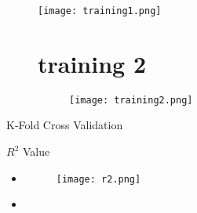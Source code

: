 \documentclass[14pt]{beamer}
\begin{document}
\begin{frame}
       \begin{figure}
            \centering
            \texttt{[image: training1.png]}            \label{fig:enter-label}
           \section{training 2}
            \begin{figure}
                \centering
                \texttt{[image: training2.png]}
                \label{fig:enter-label}
            \end{figure}
        \end{figure}
\end{frame}

\begin{frame}{K-Fold Cross Validation}
    \begin{fullpageitemize}
  \item\color{colorgreen}\begin{center}\end{center}
  \item\color{colorgreen}\begin{center}\end{center}
  \item\color{colorgreen}\begin{center}\end{center}
    \end{fullpageitemize}
\end{frame}

\begin{frame}{$R^2$ Value}
    \begin{itemize}
        \item\color{colorblue}
        \begin{figure}
            \centering
            \texttt{[image: r2.png]}
            \label{fig:enter-label}
        \end{figure}
        \item\color{colorblue}

    \end{itemize}
\end{frame}
\end{document}
